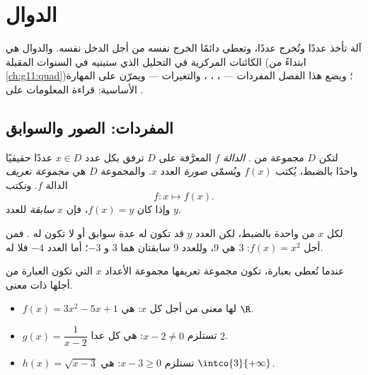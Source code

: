 \chapter{الدوال}\label{ch:g10:functions}

 آلة تأخذ عددًا وتُخرج عددًا، وتعطي دائمًا الخرج نفسه من أجل
الدخل نفسه. والدوال هي الكائنات المركزية في التحليل الذي ستبنيه في
السنوات المقبلة (ابتداءً من \cref{ch:g11:quad})؛ ويضع هذا الفصل المفردات ---
، ، ، والتغيرات --- ويمرّن على المهارة
الأساسية: قراءة المعلومات على .

\section{المفردات: الصور والسوابق}

\begin{definition}[الدالة]\label{def:g10:functions:function}
لتكن $D$ مجموعة من . \emph{الدالة} $f$
المعرَّفة على $D$ ترفق بكل عدد $x \in D$ عددًا حقيقيًا واحدًا
بالضبط، يُكتب $f(x)$ ويُسمّى \emph{صورة} العدد $x$.
والمجموعة $D$ هي \emph{مجموعة تعريف} الدالة $f$. ونكتب
\[
f : x \longmapsto f(x).
\]
وإذا كان $f(x) = y$، فإن $x$ \emph{سابقة} للعدد $y$.
\end{definition}

\begin{remark}
لكل $x$ من   واحدة بالضبط، لكن العدد $y$ قد تكون له
عدة سوابق أو لا تكون له . فمن أجل $f(x) = x^2$:  $3$ هي $9$، وللعدد
$9$ سابقتان هما $3$ و $-3$؛ أما العدد $-4$ فلا  له.
\end{remark}

\begin{example}\label{ex:g10:functions:domain}
عندما تُعطى  بعبارة، تكون مجموعة تعريفها مجموعة الأعداد $x$ التي
تكون العبارة من أجلها ذات معنى.
\begin{itemize}
  \item $f(x) = 3x^2 - 5x + 1$ لها معنى من أجل كل $x$:  هي
        $\R$.
  \item $g(x) = \dfrac{1}{x - 2}$ تستلزم $x - 2 \neq 0$:  هي
        كل  عدا $2$.
  \item $h(x) = \sqrt{x - 3}$ تستلزم $x - 3 \geq 0$:  هي
        $\intco{3}{+\infty}$.
\end{itemize}
\end{example}

